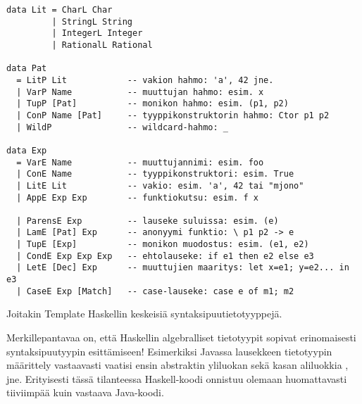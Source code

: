 \begin{listing}[H]
\begin{verbatim}
data Lit = CharL Char
         | StringL String
         | IntegerL Integer
         | RationalL Rational

data Pat
  = LitP Lit            -- vakion hahmo: 'a', 42 jne.
  | VarP Name           -- muuttujan hahmo: esim. x
  | TupP [Pat]          -- monikon hahmo: esim. (p1, p2)
  | ConP Name [Pat]     -- tyyppikonstruktorin hahmo: Ctor p1 p2
  | WildP               -- wildcard-hahmo: _

data Exp
  = VarE Name           -- muuttujannimi: esim. foo
  | ConE Name           -- tyyppikonstruktori: esim. True
  | LitE Lit            -- vakio: esim. 'a', 42 tai "mjono"
  | AppE Exp Exp        -- funktiokutsu: esim. f x

  | ParensE Exp         -- lauseke suluissa: esim. (e)
  | LamE [Pat] Exp      -- anonyymi funktio: \ p1 p2 -> e
  | TupE [Exp]          -- monikon muodostus: esim. (e1, e2)
  | CondE Exp Exp Exp   -- ehtolauseke: if e1 then e2 else e3
  | LetE [Dec] Exp      -- muuttujien maaritys: let x=e1; y=e2... in e3
  | CaseE Exp [Match]   -- case-lauseke: case e of m1; m2
\end{verbatim}
\label{lst:syntax-tree-types}
\caption{Joitakin Template Haskellin keskeisiä syntaksipuutietotyyppejä.}
\end{listing}

Merkillepantavaa on,
että Haskellin algebralliset tietotyypit sopivat erinomaisesti syntaksipuutyypin esittämiseen!
Esimerkiksi Javassa lausekkeen tietotyypin määrittely vastaavasti vaatisi ensin abstraktin yliluokan
 sekä kasan aliluokkia ,
 jne.
Erityisesti tässä tilanteessa Haskell-koodi onnistuu olemaan huomattavasti tiiviimpää kuin vastaava Java-koodi.

